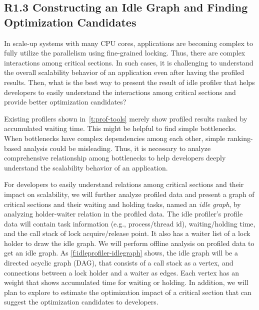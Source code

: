 \subsection{R1.3 Constructing an Idle Graph and Finding Optimization Candidates}
\label{sub:idlegraph}

\boxbeg
\begin{Challenge}
  In scale-up systems with many CPU cores, applications are becoming complex
  to fully utilize the parallelism using fine-grained locking.
  Thus, there are complex interactions among critical
  sections. In such cases, it is challenging to understand the
  overall scalability behavior of an application even after having the profiled
  results. Then, what is the best way to present the result of idle
  profiler that helps developers to easily understand the interactions among
  critical sections and provide better optimization candidates?
\end{Challenge}
\boxend

Existing profilers shown in~\autoref{t:prof-tools} merely show
profiled results ranked by accumulated waiting time. This might be
helpful to find simple bottlenecks.
When bottlenecks have complex dependencies among each other,
simple ranking-based analysis could be misleading.
Thus, it is necessary to analyze comprehensive relationship among bottlenecks
to help developers deeply understand the scalability behavior of an
application.

For developers to easily understand relations among critical sections
and their impact on scalability, we will further analyze profiled data
and present a graph of critical sections and their waiting and holding
tasks, named an {\em idle graph}, by analyzing holder-waiter relation
in the profiled data. The idle profiler's profile data will contain
task information (e.g., process/thread id), waiting/holding time, and
the call stack of lock acquire/release point. It also has a waiter
list of a lock holder to draw the idle graph.
%
We will perform offline analysis on profiled data to get an idle
graph. As \autoref{f:idleprofiler-idlegraph} shows, the idle graph
will be a directed acyclic graph (DAG), that consists of a call stack
as a vertex, and connections between a lock holder and a waiter as
edges. Each vertex has an weight that shows accumulated time for
waiting or holding.
%
In addition, we will plan to explore to estimate the optimization
impact of a critical section that can suggest the optimization
candidates to developers.

